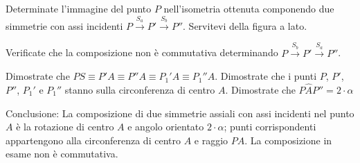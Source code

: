 \begin{exrig}
\begin{esempio}
Determinate l'immagine del punto $P$ nell'isometria ottenuta componendo due simmetrie con assi incidenti $P\overset{S_a}\rightarrow P' \overset{S_b}\rightarrow P''$. Servitevi della figura a lato.
			
Verificate che la composizione non è commutativa determinando $P\overset{S_b}\rightarrow P' \overset{S_a}\rightarrow P''$.
			
Dimostrate che $PS \equiv P'A\equiv P''A\equiv P_1'A \equiv P_1''A$.
Dimostrate che i punti $P$, $P'$, $P''$, $P_1'$ e $P_1''$ stanno sulla circonferenza di centro $A$.
Dimostrate che $P\widehat{A}P''=2\cdot \alpha$
\end{esempio}
\end{exrig}
			
Conclusione: La composizione di due simmetrie assiali con assi incidenti nel punto $A$ è la rotazione di centro $A$ e angolo orientato $2\cdot \alpha$; punti corrispondenti appartengono alla circonferenza di centro $A$ e raggio $PA$. La composizione in esame non è commutativa.

\begin{comment}			
80   ABC è un triangolo equilatero e O è il centro della circonferenza circoscritta. Dimostrate che il triangolo è unito nella rotazione di centro O e angolo =120°. Analogamente il quadrato ABCD  è unito nella rotazione di centro H, punto d’incontro delle sue diagonali, di angolo =90°. 
81   Giustificate la verità della proposizione: “La simmetria centrale di centro K è una rotazione di 180°”.
82   Nel piano dotato di riferimento cartesiano è tracciata la bisettrice I°-III° quadrante e la retta . Completate le osservazioni seguenti:
il punto di intersezione K ha coordinate K(…,…)
l’angolo delle due rette è di …..°
83   Scrivete l’equazione della simmetria avente come asse la bisettrice:  e l’equazione della simmetria di asse la retta : .
84   Determinate le coordinate del punto P” immagine di P, arbitrariamente scelto, in  e scrivete l’equazione di .
Concludete:  è la rotazione di centro ……. e angolo ……(ricordate il segno all’angolo di rotazione)
85   Determinate le coordinate del punto P* immagine di P, arbitrariamente scelto, in  e scrivete l’equazione di *.
Concludete: * è la rotazione di centro ……. e angolo ……(ricordate il segno all’angolo di rotazione)
86   Determinate l’equazione della isometria  e stabilite se esiste qualche elemento unito. Come cambia l’equazione dell’isometria  rispetto alla precedente? Sia J che J* sono rotazioni: determinate centro e angolo (con segno) di ciascuna. A questo scopo potete utilizzare il punto P(2,4) o un punto arbitrariamente scelto.
87   Determinate l’immagine del punto A nell’isometriaessendo a e b le rette parallele segnate in figura e A il punto dato. Dimostrate che  essendo d la distanza tra le rette a e b.
Fissate arbitrariamente un altro punto B non appartenente ad alcuna delle rette date e determinate la sua immagine B” nell’isometria .
È vero che  ? Potete concludere che l’isometria  è la traslazione di vettore ?
\end{comment}
			
